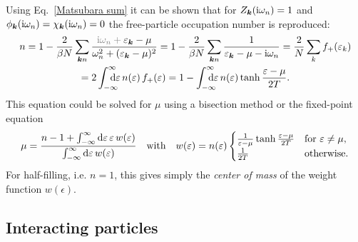 Using Eq.~\ref{Matsubara sum} it can be shown that for $Z_{\boldsymbol k}(\mathrm i \omega_n)
= 1$ and $\phi_{\boldsymbol k}(\mathrm i \omega_n) = \chi_{\boldsymbol k}(\mathrm i \omega_n) = 0$ the
free-particle occupation number is reproduced:
%
\begin{multline*}
    n = 1 - \frac 2 {\beta N} \sum_{\vec k n}
    \frac
        {\textcolor{gray}{\I \omega_n + {}} \epsilon_{\vec k} - \mu}
        {\omega_n^2 + (\epsilon_{\vec k} - \mu)^2}
    = 1 - \frac 2 {\beta N} \sum_{\vec k n}
    \frac 1 {\epsilon_{\vec k} - \mu - \I \omega_n}
    = \frac 2 N \sum_k f_+(\epsilon_k)
    \\
    = 2 \int \from{-\infty} \till \infty \D \epsilon \,
    n(\epsilon) \, f_+(\epsilon)
    = 1 - \int \from{-\infty} \till \infty \D \epsilon \,
    n(\epsilon) \tanh \frac{\epsilon - \mu}{2 T}.
\end{multline*}
%
This equation could be solved for $\mu$ using a bisection method or the
fixed-point equation
%
\begin{equation} \label{fixed point free}
    \mu = \frac
        {n - 1 + \int_{-\infty}^\infty \mathrm d \varepsilon \, \varepsilon \, w(\varepsilon)}
        {\int_{-\infty}^\infty \mathrm d \varepsilon \, w(\varepsilon)}
    \quad \text{with} \quad
    w(\varepsilon) = n(\varepsilon)
    \begin{cases}
       \frac 1 {\varepsilon - \mu} \tanh \frac{\varepsilon - \mu}{2 T}
          & \text{for $\varepsilon \neq \mu$,} \\
       \frac 1 {2 T}
          & \text{otherwise.}
    \end{cases}
\end{equation}
%
For half-filling, i.e. $n = 1$, this gives simply the \emph{center of mass} of
the weight function $w(\epsilon)$.

\subsection{Interacting particles}

